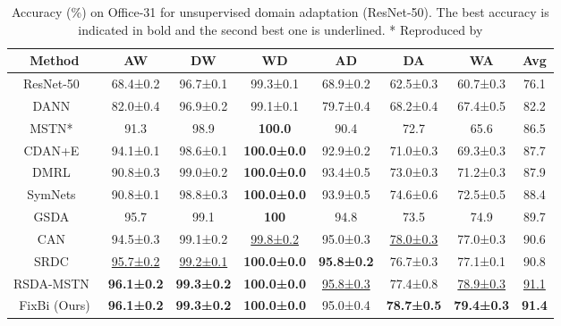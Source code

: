 \documentclass[final]{cvpr}
\begin{document}
\begin{table*}[h!]
\begin{center}
\caption{Accuracy (\%) on Office-31 for unsupervised domain adaptation (ResNet-50). The best accuracy is indicated in bold and the second best one is underlined. * Reproduced by \cite{DSBN}}
\label{tab:Office-31}
\begin{tabular}{ccccccc|c}
\hline
Method       & AW & DW & WD & AD & DA & WA                    & Avg          \\ 
\hline\hline
ResNet-50~\cite{ResNet1} & 68.4±0.2          & 96.7±0.1       & 99.3±0.1           & 68.9±0.2          & 62.5±0.3 & \multicolumn{1}{c|}{60.7±0.3} & 76.1 \\
DANN~\cite{Ganin2015}   & 82.0±0.4          & 96.9±0.2       & 99.1±0.1           & 79.7±0.4          & 68.2±0.4 & \multicolumn{1}{c|}{67.4±0.5} & 82.2 \\
MSTN*~\cite{MSTN}      & 91.3              & 98.9           & \textbf{100.0}     & 90.4              & 72.7     & \multicolumn{1}{c|}{65.6}     & 86.5 \\
CDAN+E~\cite{CDAN}      & 94.1±0.1          & 98.6±0.1       & \textbf{100.0±0.0} & 92.9±0.2          & 71.0±0.3 & \multicolumn{1}{c|}{69.3±0.3} & 87.7 \\
DMRL~\cite{Wu2020}      & 90.8±0.3          & 99.0±0.2       & \textbf{100.0±0.0} & 93.4±0.5          & 73.0±0.3 & \multicolumn{1}{c|}{71.2±0.3} & 87.9 \\
SymNets~\cite{SymNets}   & 90.8±0.1          & 98.8±0.3       & \textbf{100.0±0.0} & 93.9±0.5          & 74.6±0.6 & \multicolumn{1}{c|}{72.5±0.5} & 88.4 \\
GSDA~\cite{GSDA}      & 95.7              & 99.1           & \textbf{100}       & 94.8              & 73.5     & \multicolumn{1}{c|}{74.9}     & 89.7 \\
CAN~\cite{CAN2019}       & 94.5±0.3          & 99.1±0.2       & \underline{99.8±0.2}           & 95.0±0.3          & \underline{78.0±0.3} & \multicolumn{1}{c|}{77.0±0.3} & 90.6 \\
SRDC~\cite{SRDC}      & \underline{95.7±0.2}          & \underline{99.2±0.1}       & \textbf{100.0±0.0}     & \textbf{95.8±0.2}          & 76.7±0.3 & \multicolumn{1}{c|}{77.1±0.1} & 90.8 \\
RSDA-MSTN~\cite{Gu2020} & \textbf{96.1±0.2} & \textbf{99.3±0.2}       & \textbf{100.0±0.0}       & \underline{95.8±0.3}          & 77.4±0.8 & \multicolumn{1}{c|}{\underline{78.9±0.3}} & \underline{91.1} \\ \hline
FixBi (Ours) &\textbf{96.1±0.2}            & \textbf{99.3±0.2}            & \textbf{100.0±0.0}  & 95.0±0.4            & \textbf{78.7±0.5}   & \multicolumn{1}{c|}{{\textbf{79.4±0.3}}} & \textbf{91.4} \\ \hline
\end{tabular}
\end{center}
\end{table*}
\end{document}
